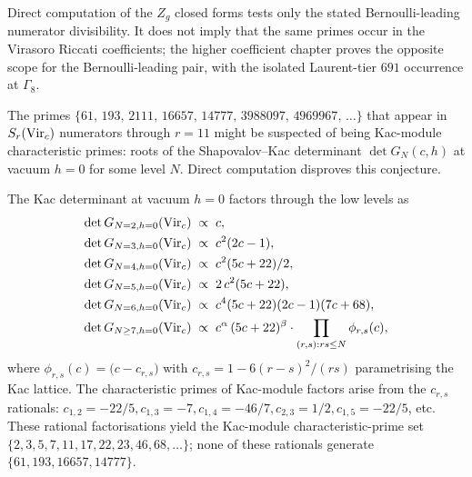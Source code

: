 \begin{remark}
Direct computation of the $Z_g$ closed forms tests only the stated
Bernoulli-leading numerator divisibility. It does not imply that the
same primes occur in the Virasoro Riccati coefficients; the higher
coefficient chapter proves the opposite scope for the Bernoulli-leading
pair, with the isolated Laurent-tier $691$ occurrence at $\Gamma_8$.
\end{remark}

\begin{remark}
\ClaimStatusProvedHere
The primes $\{61,\, 193,\, 2111,\, 16657,\, 14777,\, 3988097,\,
4969967,\, \ldots\}$ that appear in $S_r(\mathrm{Vir}_c)$ numerators
through $r = 11$ might be suspected of being Kac-module
characteristic primes: roots of the Shapovalov--Kac determinant
$\det G_N(c, h)$ at vacuum $h = 0$ for some level $N$. Direct
computation disproves this conjecture.

The Kac determinant at vacuum $h = 0$ factors through the low
levels as
\begin{align*}
 \det G_{N = 2, h = 0}(\mathrm{Vir}_c) &\;\propto\; c, \\
 \det G_{N = 3, h = 0}(\mathrm{Vir}_c) &\;\propto\; c^{2}(2c - 1), \\
 \det G_{N = 4, h = 0}(\mathrm{Vir}_c) &\;\propto\; c^{2}(5c + 22)/2, \\
 \det G_{N = 5, h = 0}(\mathrm{Vir}_c) &\;\propto\; 2\, c^{2}(5c + 22), \\
 \det G_{N = 6, h = 0}(\mathrm{Vir}_c) &\;\propto\; c^{4}(5c+22)(2c-1)(7c+68), \\
 \det G_{N \geq 7, h = 0}(\mathrm{Vir}_c) &\;\propto\; c^{\alpha}\, (5c+22)^{\beta}
 \cdot \prod_{(r, s) : rs \leq N} \phi_{r, s}(c),
\end{align*}
where $\phi_{r, s}(c) = \bigl(c - c_{r, s}\bigr)$ with $c_{r, s} =
1 - 6(r - s)^{2}/(rs)$ parametrising the Kac lattice. The
characteristic primes of Kac-module factors arise from the
$c_{r, s}$ rationals: $c_{1, 2} = -22/5, c_{1, 3} = -7,
c_{1, 4} = -46/7, c_{2, 3} = 1/2, c_{1, 5} = -22/5$, etc. These
rational factorisations yield the Kac-module characteristic-prime
set $\{2, 3, 5, 7, 11, 17, 22, 23, 46, 68, \ldots\}$; none of
these rationals generate $\{61, 193, 16657, 14777\}$.


\end{remark}
